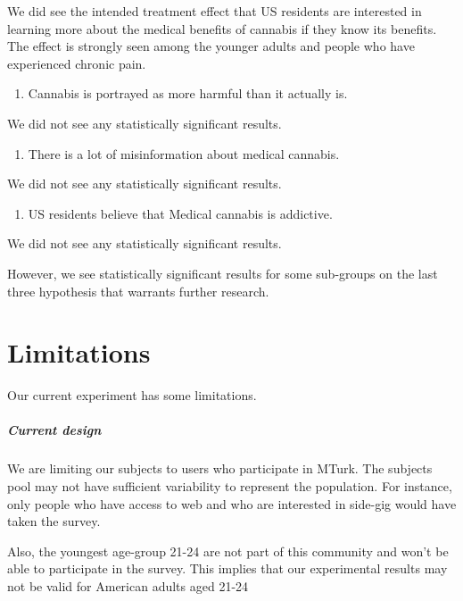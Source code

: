 \documentclass[
]{article}
\providecommand{\tightlist}{%
  \setlength{\itemsep}{0pt}\setlength{\parskip}{0pt}}
\begin{document}
We did see the intended treatment effect that US residents are
interested in learning more about the medical benefits of cannabis if
they know its benefits. The effect is strongly seen among the younger
adults and people who have experienced chronic pain.

\begin{enumerate}
\def\labelenumi{\arabic{enumi}.}
\setcounter{enumi}{1}
\tightlist
\item
  Cannabis is portrayed as more harmful than it actually is.
\end{enumerate}

We did not see any statistically significant results.

\begin{enumerate}
\def\labelenumi{\arabic{enumi}.}
\setcounter{enumi}{2}
\tightlist
\item
  There is a lot of misinformation about medical cannabis.
\end{enumerate}

We did not see any statistically significant results.

\begin{enumerate}
\def\labelenumi{\arabic{enumi}.}
\setcounter{enumi}{3}
\tightlist
\item
  US residents believe that Medical cannabis is addictive.
\end{enumerate}

We did not see any statistically significant results.

However, we see statistically significant results for some sub-groups on
the last three hypothesis that warrants further research.

\hypertarget{limitations}{%
\section{Limitations}\label{limitations}}

Our current experiment has some limitations.

\hypertarget{current-design}{%
\subparagraph{Current design}\label{current-design}}

We are limiting our subjects to users who participate in MTurk. The
subjects pool may not have sufficient variability to represent the
population. For instance, only people who have access to web and who are
interested in side-gig would have taken the survey.

Also, the youngest age-group 21-24 are not part of this community and
won't be able to participate in the survey. This implies that our
experimental results may not be valid for American adults aged 21-24
\end{document}
